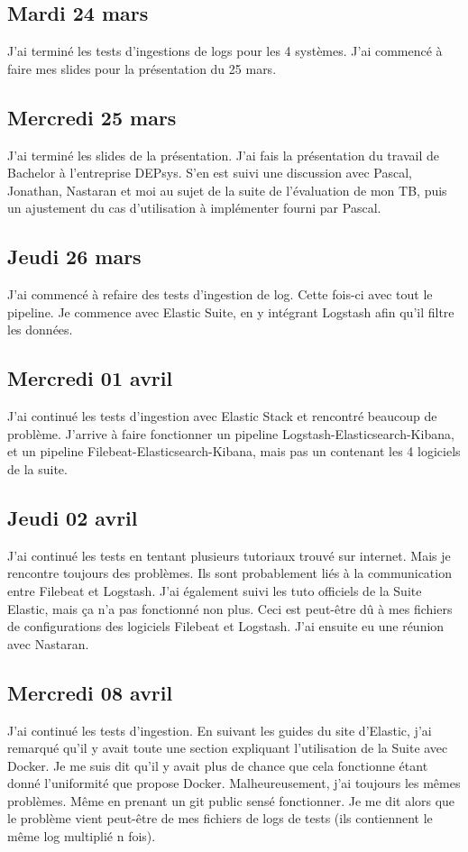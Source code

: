 \documentclass[paper=a4, fontsize=11pt]{scrartcl}
\begin{document}
\subsection{Mardi 24 mars}
    J'ai terminé les tests d'ingestions de logs pour les 4 systèmes. J'ai commencé à faire mes slides pour la présentation du 25 mars.
\subsection{Mercredi 25 mars}
    J'ai terminé les slides de la présentation. J'ai fais la présentation du travail de Bachelor à l'entreprise DEPsys. S'en est suivi une discussion avec Pascal, Jonathan, Nastaran et moi au sujet de la suite de l'évaluation de mon TB, puis un ajustement du cas d'utilisation à implémenter fourni par Pascal.
\subsection{Jeudi 26 mars}
    J'ai commencé à refaire des tests d'ingestion de log. Cette fois-ci avec tout le pipeline. Je commence avec Elastic Suite, en y intégrant Logstash afin qu'il filtre les données.
\subsection{Mercredi 01 avril}
    J'ai continué les tests d'ingestion avec Elastic Stack et rencontré beaucoup de problème. J'arrive à faire fonctionner un pipeline Logstash-Elasticsearch-Kibana, et un pipeline Filebeat-Elasticsearch-Kibana, mais pas un contenant les 4 logiciels de la suite.
\subsection{Jeudi 02 avril}
    J'ai continué les tests en tentant plusieurs tutoriaux trouvé sur internet. Mais je rencontre toujours des problèmes. Ils sont probablement liés à la communication entre Filebeat et Logstash. J'ai également suivi les tuto officiels de la Suite Elastic, mais ça n'a pas fonctionné non plus. Ceci est peut-être dû à mes fichiers de configurations des logiciels Filebeat et Logstash. J'ai ensuite eu une réunion avec Nastaran.
\subsection{Mercredi 08 avril}
    J'ai continué les tests d'ingestion. En suivant les guides du site d'Elastic, j'ai remarqué qu'il y avait toute une section expliquant l'utilisation de la Suite avec Docker. Je me suis dit qu'il y avait plus de chance que cela fonctionne étant donné l'uniformité que propose Docker. Malheureusement, j'ai toujours les mêmes problèmes. Même en prenant un git public sensé fonctionner. Je me dit alors que le problème vient peut-être de mes fichiers de logs de tests (ils contiennent le même log multiplié n fois).
\end{document}
